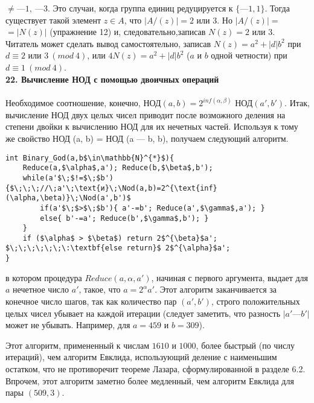 $\neq—1,~—3$. Это случаи, когда группа единиц редуцируется к $\{—1,1\}$. Тогда\linebreak 
существует такой элемент  $z\in A$, что $|A/(z)|=2$ или $3$. Но $|A/(z)|=$\linebreak
$=|N(z)|$ (упражнение 12) и, следовательно,записав $N(z)=2$ или $3$. Читатель\linebreak
может сделать вывод самостоятельно, записав $N(z) = a^2 + |d|b^2$ при\linebreak
$d\equiv2$ или $3~(mod~4)$, или $4N(z) = a^2 + |d|b^2$ ($a$ и $b$ одной четности) при\linebreak
$d\equiv1~(mod~4)$.\newline
\\
\noindent\textbf{22. Вычисление НОД с помощью двоичных операций}\\
\\
\hspace*{15pt} Необходимое соотношение, конечно, НОД$(a, b) =2^{inf(\alpha , \beta)}$ НОД$(a', b')$.\linebreak
Итак,\: вычисление\: НОД\: двух\: целых\: чисел\: приводит\: после возможного
\newpage
%
%
\noindent деления на степени двойки к вычислению НОД для их нечетных частей.
Используя к тому же свойство НОД (a, b) = НОД (a — b, b), получаем
следующий алгоритм.
\begin{leftbar}
\begin{lstlisting}[frame=none, mathescape=true]
int Binary_God(a,b$\in\mathbb{N}^{*}$){
	Reduce(a,$\alpha$,a'); Reduce(b,$\beta$,b');
	while(a'$\;$!=$\;$b'){$\;\;\;//\;a'\;\text{и}\;\Nod(a,b)=2^{\text{inf}(\alpha,\beta)}\;\Nod(a',b')$
		if(a'$\;$>$\;$b'){ a'-=b'; Reduce(a',$\gamma$,a'); }
		else{ b'-=a'; Reduce(b',$\gamma$,b'); }
	}
	if ($\alpha$ > $\beta$) return 2$^{\beta}$a';
$\;\;\;\;\;\;\:\textbf{else return}$ 2$^{\alpha}$a';
}				
\end{lstlisting}
\end{leftbar}
\noindent в котором процедура $Reduce(a, \alpha, a')$, начиная с первого аргумента, вы­дает для $a$ нечетное число $a'$, такое, что $a = 2^{\alpha} a'$. Этот алгоритм заканчивается за конечное число шагов, так как количество пар $(a', b')$,
строго положительных целых чисел убывает на каждой итерации (сле­дует заметить, что разность $|a' — b'|$ может не убывать. Например, для
$a = 459$ и $b = 309$).

Этот алгоритм, примененный к числам $1610$ и $1000$, более быстрый
(по числу итераций), чем алгоритм Евклида, использующий деление с
наименьшим остатком, что не противоречит теореме Лазара, сформу­лированной в разделе 6.2. Впрочем, этот алгоритм заметно более медленный, чем алгоритм Евклида для пары $(509,3)$.

